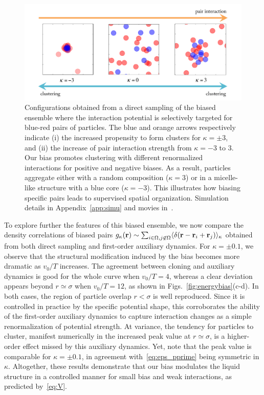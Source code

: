\documentclass[superscriptaddress, twocolumn, prx, longbibliography, nofootinbib]{revtex4-1}
\begin{document}
\begin{figure}
	\centering
	\includegraphics[width=.9\linewidth]{fig4.pdf}
	\caption{\label{fig:outofperturbation}
	Configurations obtained from a direct sampling of the biased ensemble where the interaction potential is selectively targeted for blue-red pairs of particles. The blue and orange arrows respectively indicate (i) the increased propensity to form clusters for $\kappa=\pm3$, and (ii) the increase of pair interaction strength from $\kappa=-3$ to $3$. Our bias promotes clustering with different renormalized interactions for positive and negative biases. As a result, particles aggregate either with a random composition ($\kappa=3$) or in a micelle-like structure with a blue core ($\kappa=-3$). This illustrates how biasing specific pairs leads to supervised spatial organization.
		Simulation details in Appendix~\ref{app:simu} and movies in~\cite{movie}.
	}
\end{figure}


To explore further the features of this biased ensemble, we now compare the density correlations of biased pairs $g_\kappa({\bf r})\sim \sum_{i\in\Omega,j\not\in\Omega}\langle \delta({\bf r}-{\bf r}_i+{\bf r}_j)\rangle_\kappa$ obtained from both direct sampling and first-order auxiliary dynamics. For $\kappa=\pm0.1$, we observe that the structural modification induced by the bias becomes more dramatic as $v_0/T$ increases. The agreement between cloning and auxiliary dynamics is good for the whole curve when $v_0/T=4$, whereas a clear deviation appears beyond $r\simeq\sigma$ when $v_0/T=12$, as shown in Figs.~\ref{fig:energybias}(c-d). In both cases, the region of particle overlap $r<\sigma$ is well reproduced. Since it is controlled in practice by the specific potential shape, this corroborates the ability of the first-order auxiliary dynamics to capture interaction changes as a simple renormalization of potential strength. At variance, the tendency for particles to cluster, manifest numerically in the increased peak value at $r\simeq\sigma$, is a higher-order effect missed by this auxiliary dynamics. Yet, note that the peak value is comparable for $\kappa=\pm0.1$, in agreement with~\eqref{eq:eps_pprime} being symmetric in $\kappa$. Altogether, these results demonstrate that our bias modulates the liquid structure in a controlled manner for small bias and weak interactions, as predicted by~\eqref{eq:V}.
\end{document}
